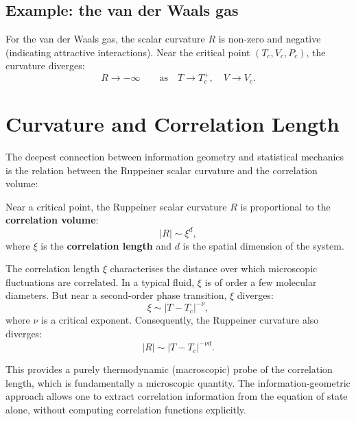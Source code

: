 \subsection{Example: the van der Waals gas}

For the van der Waals gas, the scalar curvature $R$ is non-zero and negative (indicating attractive interactions). Near the critical point $(T_c, V_c, P_c)$, the curvature diverges:
\begin{equation}
R \to -\infty \qquad \text{as} \quad T \to T_c^+, \quad V \to V_c.
\end{equation}

\section{Curvature and Correlation Length}

The deepest connection between information geometry and statistical mechanics is the relation between the Ruppeiner scalar curvature and the correlation volume:

\begin{theorem}
Near a critical point, the Ruppeiner scalar curvature $R$ is proportional to the \textbf{correlation volume}:
\begin{equation}
\boxed{|R| \sim \xi^d,}
\end{equation}
where $\xi$ is the \textbf{correlation length} and $d$ is the spatial dimension of the system.
\end{theorem}

The correlation length $\xi$ characterises the distance over which microscopic fluctuations are correlated. In a typical fluid, $\xi$ is of order a few molecular diameters. But near a second-order phase transition, $\xi$ diverges:
\begin{equation}
\xi \sim |T - T_c|^{-\nu},
\end{equation}
where $\nu$ is a critical exponent. Consequently, the Ruppeiner curvature also diverges:
\begin{equation}
|R| \sim |T - T_c|^{-\nu d}.
\end{equation}

\begin{remark}
This provides a purely thermodynamic (macroscopic) probe of the correlation length, which is fundamentally a microscopic quantity. The information-geometric approach allows one to extract correlation information from the equation of state alone, without computing correlation functions explicitly.
\end{remark}

